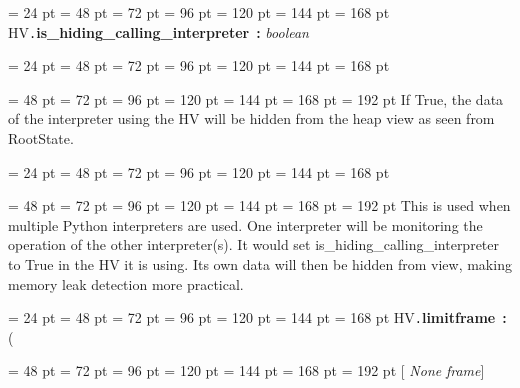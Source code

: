{{{{\par}
\par}
\par}
{\par \noindent  \leftskip = 24 pt  \leftmargini = 48 pt  \leftmarginii = 72 pt  \leftmarginiii = 96 pt  \leftmarginiv = 120 pt  \leftmarginv = 144 pt  \leftmarginvi = 168 pt HV{\tt .\/}{\bf {\large {\bf is{\_}hiding{\_}calling{\_}interpreter\/}}\/}~{\bf :}  {\em boolean\/}\par}
{\par \noindent  \leftskip = 24 pt  \leftmargini = 48 pt  \leftmarginii = 72 pt  \leftmarginiii = 96 pt  \leftmarginiv = 120 pt  \leftmarginv = 144 pt  \leftmarginvi = 168 pt {\par \noindent
{\par \noindent  \leftskip = 48 pt  \leftmargini = 72 pt  \leftmarginii = 96 pt  \leftmarginiii = 120 pt  \leftmarginiv = 144 pt  \leftmarginv = 168 pt  \leftmarginvi = 192 pt 
If True, the data of the interpreter using the HV will be hidden from
the heap view as seen from RootState.\par}
\par}
\par}
{\par \noindent  \leftskip = 24 pt  \leftmargini = 48 pt  \leftmarginii = 72 pt  \leftmarginiii = 96 pt  \leftmarginiv = 120 pt  \leftmarginv = 144 pt  \leftmarginvi = 168 pt {\par \noindent
{\par \noindent  \leftskip = 48 pt  \leftmargini = 72 pt  \leftmarginii = 96 pt  \leftmarginiii = 120 pt  \leftmarginiv = 144 pt  \leftmarginv = 168 pt  \leftmarginvi = 192 pt This is used when multiple Python interpreters are used. One
interpreter will be monitoring the operation of the other
interpreter(s). It would set is{\_}hiding{\_}calling{\_}interpreter to True in
the HV it is using. Its own data will then be hidden from view, making
memory leak detection more practical.
\par}
\par}
\par}
{\par \noindent  \leftskip = 24 pt  \leftmargini = 48 pt  \leftmarginii = 72 pt  \leftmarginiii = 96 pt  \leftmarginiv = 120 pt  \leftmarginv = 144 pt  \leftmarginvi = 168 pt HV{\tt .\/}{\bf {\large {\bf limitframe\/}}\/}~{\bf :}  ({\par \noindent
{\par \noindent  \leftskip = 48 pt  \leftmargini = 72 pt  \leftmarginii = 96 pt  \leftmarginiii = 120 pt  \leftmarginiv = 144 pt  \leftmarginv = 168 pt  \leftmarginvi = 192 pt {\bf {}\/}{[} {\em None\/}{\bf {}\/} {\em frame\/}]\par}
}}}
